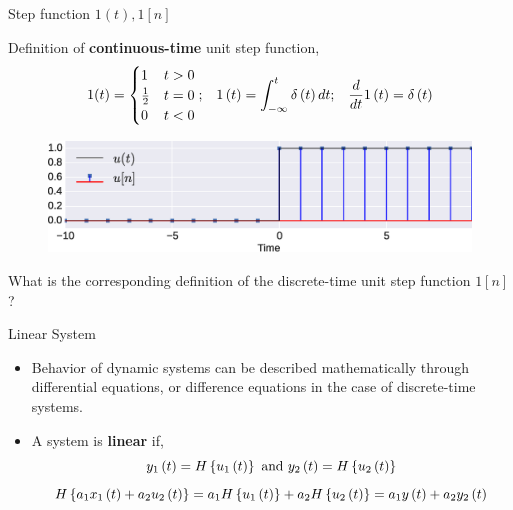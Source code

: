 \documentclass[aspectratio=169]{beamer}
\def\lp{\ensuremath\left(}
\def\rp{\ensuremath\right)}
\def\lc{\ensuremath\left\{}
\def\rc{\ensuremath\right\}}
\begin{document}
\begin{frame}{Step function $1(t), 1[n]$}

Definition of \textbf{continuous-time} unit step function,
\[ 1(t) = \begin{cases}
1 & t > 0\\
\frac{1}{2} & t = 0\\
0 & t < 0
\end{cases}; \,\,\,\,\, 1\lp t\rp = \int_{-\infty}^{t} \delta\lp t\rp dt; \,\,\,\,\,  \frac{d}{dt}1\lp t\rp = \delta\lp t\rp\]

\begin{figure}
\includegraphics[width=\textwidth]{img/step.eps}
\end{figure}

What is the corresponding definition of the discrete-time unit step function $1[n]$?
\end{frame}


\begin{frame}{Linear System}
\begin{center}
\end{center}
\begin{itemize}
    \item Behavior of dynamic systems can be described mathematically through differential equations, or difference equations in the case of discrete-time systems.
    \item A system is \textbf{linear} if, 
    \[ y_1\lp t\rp = H\lc u_1\lp t\rp\rc \text{ and } y_2\lp t\rp = H\lc u_2 \lp t\rp \rc\]
    \[ H\lc a_1x_1\lp t\rp + a_2u_2\lp t\rp \rc = a_1H\lc u_1\lp t\rp\rc + a_2H\lc u_2\lp t\rp \rc = a_1y\lp t\rp + a_2y_2\lp t\rp \]
\end{itemize}
\end{frame}
\end{document}
